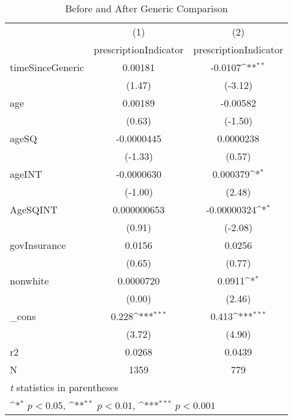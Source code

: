\begin{table}[htbp]\centering
\def\sym#1{\ifmmode^{#1}\else\(^{#1}\)\fi}
\caption{Before and After Generic Comparison\label{tab1}}
\begin{tabular}{l*{2}{c}}
\hline\hline
            &\multicolumn{1}{c}{(1)}&\multicolumn{1}{c}{(2)}\\
            &\multicolumn{1}{c}{prescriptionIndicator}&\multicolumn{1}{c}{prescriptionIndicator}\\
\hline
timeSinceGeneric&     0.00181         &     -0.0107\sym{**} \\
            &      (1.47)         &     (-3.12)         \\
[1em]
age         &     0.00189         &    -0.00582         \\
            &      (0.63)         &     (-1.50)         \\
[1em]
ageSQ       &  -0.0000445         &   0.0000238         \\
            &     (-1.33)         &      (0.57)         \\
[1em]
ageINT      &  -0.0000630         &    0.000379\sym{*}  \\
            &     (-1.00)         &      (2.48)         \\
[1em]
AgeSQINT    & 0.000000653         & -0.00000324\sym{*}  \\
            &      (0.91)         &     (-2.08)         \\
[1em]
govInsurance&      0.0156         &      0.0256         \\
            &      (0.65)         &      (0.77)         \\
[1em]
nonwhite    &   0.0000720         &      0.0911\sym{*}  \\
            &      (0.00)         &      (2.46)         \\
[1em]
\_cons      &       0.228\sym{***}&       0.413\sym{***}\\
            &      (3.72)         &      (4.90)         \\
\hline
r2          &      0.0268         &      0.0439         \\
N           &        1359         &         779         \\
\hline\hline
\multicolumn{3}{l}{\footnotesize \textit{t} statistics in parentheses}\\
\multicolumn{3}{l}{\footnotesize \sym{*} \(p<0.05\), \sym{**} \(p<0.01\), \sym{***} \(p<0.001\)}\\
\end{tabular}
\end{table}
